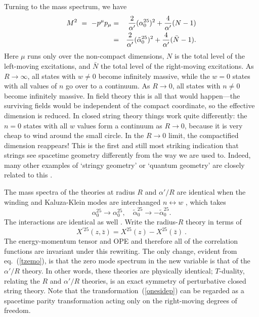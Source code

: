 \documentclass[12pt]{article}
\def\be{\begin{equation}}
\def\ee{\end{equation}}
\def\bea{\begin{eqnarray}}
\def\eea{\end{eqnarray}}
\def\ap{\alpha'}
\newcommand{\zb}{{\bar{z}}}
\begin{document}
Turning to the mass spectrum, we have
\bea
M^2\ =\ -p^\mu p_\mu &=&
{2\over\ap}(\alpha_0^{25})^2+{4\over\ap}
({ N}-1) \nonumber\\
&=& {2\over\ap}({\tilde\alpha}_0^{25})^2+{4\over\ap}
( {\bar N}-1).
\eea
Here $\mu$ runs only over the non-compact dimensions, $N$ is the
total level of the left-moving excitations, and $ \bar N$ the total
level of the right-moving excitations.  As $R \to \infty$, all states with
$w\neq 0$ become infinitely massive, while the $w=0$ states with all
values of $n$ go over to a continuum.  As $R\to 0$, all states with $n
\neq 0$ become infinitely massive.  In field theory this is all that would
happen---the surviving fields would be independent of the compact
coordinate, so the effective dimension is reduced.  In closed string theory
things work quite differently: the $n=0$ states with all $w$ values form a
continuum as $R\to 0$, because it is very cheap to wind around the small
circle.  In the $R\to 0$ limit, the compactified dimension reappears!
This is the first and still most striking indication that strings see
spacetime geometry differently from the way we are used to.  Indeed, many
other examples of `stringy geometry' or `quantum geometry' are closely
related to this \cite{mirror}.

The mass spectra of the theories at radius $R$ and $\ap/ R$ are identical
when the winding and Kaluza-Klein modes are interchanged
$n \leftrightarrow w$ \cite{tdual},
which takes
\be
\alpha^{25}_0 \rightarrow\alpha^{25}_0, \quad
{\tilde\alpha}_0^{25} \rightarrow -{\tilde\alpha}_0^{25} 
\label{tzemo}.
\ee
The interactions are identical as well \cite{nairet}.
Write the radius-$R$
theory in terms of 
\be
X^{\prime25}(z,\zb)=X^{25}(z)-X^{25}(\zb)\ . \label{onesidep}
\ee
The energy-momentum tensor and OPE and therefore all of the correlation
functions are invariant under this rewriting.  The only change, evident
from eq.~(\ref{tzemo}), is that the zero mode spectrum in the new variable
is that of the $\ap/R$ theory.  In other words, these theories are
physically identical; 
$T$-duality, relating the $R$ and $\ap/R$ theories, is an exact
symmetry of perturbative closed string theory.  Note that the
transformation~(\ref{onesidep}) can be regarded as a spacetime parity
transformation acting only on the right-moving degrees of freedom.
\end{document}
